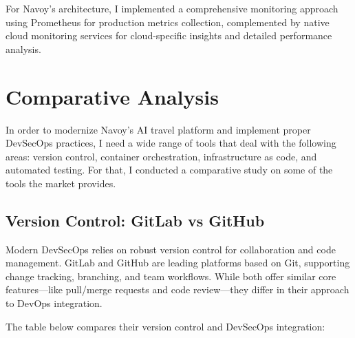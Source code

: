 For Navoy's architecture, I implemented a comprehensive monitoring approach using Prometheus for production metrics collection, complemented by native cloud monitoring services for cloud-specific insights and detailed performance analysis.

\section{Comparative Analysis}
In order to modernize Navoy's AI travel platform and implement proper DevSecOps practices, I need a wide range of tools that deal with the following areas: version control, container orchestration, infrastructure as code, and automated testing. For that, I conducted a comparative study on some of the tools the market provides.

\subsection{Version Control: GitLab vs GitHub}
Modern DevSecOps relies on robust version control for collaboration and code management. GitLab and GitHub are leading platforms based on Git, supporting change tracking, branching, and team workflows. While both offer similar core features—like pull/merge requests and code review—they differ in their approach to DevOps integration.

The table below compares their version control and DevSecOps integration:

